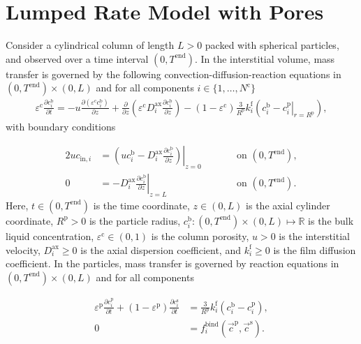 \documentclass{article}
\begin{document}
\section*{Lumped Rate Model with Pores}
Consider a cylindrical column of length $L > 0$ packed with spherical particles, and observed over a time interval $(0, T^{\mathrm{end}})$.
In the interstitial volume, mass transfer is governed by the following convection-diffusion-reaction equations in $(0, T^\mathrm{end})\times (0, L)$ and for all components $i\in\{1, \dots, N^{\mathrm{c}} \}$
\begin{align}
\varepsilon^{\mathrm{c}} \frac{\partial c^{\mathrm{b}}_i}{\partial t} = - u \frac{\partial \left( \varepsilon^{\mathrm{c}} c^{\mathrm{b}}_i \right)}{\partial z} + \frac{\partial}{\partial z} \left( \varepsilon^{\mathrm{c}} D^{\mathrm{ax}}_{i} \frac{\partial c^{\mathrm{b}}_i}{\partial z} \right)- \left(1 - \varepsilon^{\mathrm{c}} \right) \frac{3}{R^{\mathrm{p}}} k^{\mathrm{f}}_{i} \left(c^{\mathrm{b}}_i - \left. c^{\mathrm{p}}_{i} \right|_{r = R^{\mathrm{p}}} \right),
\end{align}
with boundary conditions

\begin{alignat}{2}
u c_{\mathrm{in},i} &= \left.\left( u c^{\mathrm{b}}_i - D^{\mathrm{ax}}_{i} \frac{\partial c^{\mathrm{b}}_i}{\partial z}\right)\right|_{z=0} & &\qquad\text{on }(0, T^{\mathrm{end}}),\\
               0 &= - D^{\mathrm{ax}}_{i} \left. \frac{\partial c^{\mathrm{b}}_i}{\partial z} \right|_{z=L} & &\qquad\text{on }(0, T^{\mathrm{end}}).
\end{alignat}
Here, $t\in (0, T^{\mathrm{end}})$ is the time coordinate, $z\in (0, L)$ is the axial cylinder coordinate, $R^\mathrm{p}> 0$ is the particle radius, $c^{\mathrm{b}}_i\colon (0, T^\mathrm{end})\times (0, L) \mapsto \mathbb{R}$ is the bulk liquid concentration, $\varepsilon^{\mathrm{c}}\in (0, 1)$ is the column porosity, $u> 0$ is the interstitial velocity, $D^\mathrm{ax}_i\geq 0$ is the axial dispersion coefficient, and $k^\mathrm{f}_{i}\geq 0$ is the film diffusion coefficient.
In the particles, mass transfer is governed by reaction equations in $(0, T^\mathrm{end}) \times (0, L)$ and for all components

\begin{align}

          \varepsilon^{\mathrm{p}}\frac{\partial c^{\mathrm{p}}_{i}}{\partial t}  + \left( 1 - \varepsilon^{\mathrm{p}}\right) \frac{\partial c^{\mathrm{s}}_{i}}{\partial t} 
          &=\frac{3}{R^{\mathrm{p}}} k^\mathrm{f}_{i} \left( c^{\mathrm{b}}_{i} - c^{\mathrm{p}}_{i} \right) ,\\

          0
          &= f^{\mathrm{bind}}_{i}\left( \vec{c}^{\mathrm{p}}, \vec{c}^{\mathrm{s}} \right).
\end{align}
\end{document}
